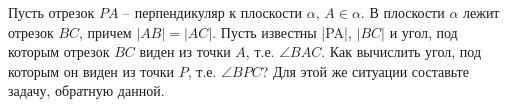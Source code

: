 Пусть отрезок $PA$ -- перпендикуляр к плоскости $\alpha$, $A\in\alpha$. В плоскости $\alpha$ лежит отрезок $BC$, причем $|AB|=|AC|$. Пусть известны |PA|, $|BC|$ и угол, под которым отрезок $BC$ виден из точки $A$, т.е. $\angle BAC$. Как вычислить угол, под которым он виден из точки $P$, т.е. $\angle BPC$? Для этой же ситуации составьте задачу, обратную данной.